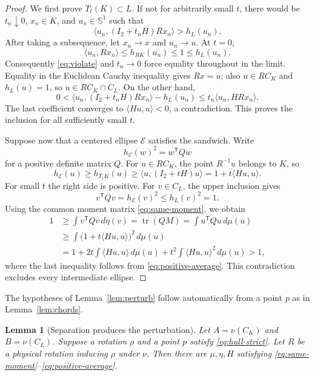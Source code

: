 \documentclass[11pt]{amsart}
\newtheorem{lemma}[theorem]{Lemma}
\theoremstyle{definition}
\theoremstyle{remark}
\newcommand{\Sph}{\mathbb S^1}
\newcommand{\tr}{\operatorname{tr}}
\newcommand{\ip}[2]{\langle #1,#2\rangle}
\begin{document}
\begin{proof}
We first prove $T_t(K)\subset L$.  If not for arbitrarily small $t$, there
would be $t_n\downarrow0$, $x_n\in K$, and $u_n\in\Sph$ such that
\begin{equation}\label{eq:violate}
 \ip{u_n}{(I_2+t_nH)R x_n}>h_L(u_n).
\end{equation}
After taking a subsequence, let $x_n\to x$ and $u_n\to u$.  At $t=0$,
\[
 \ip{u_n}{R x_n}\le h_{RK}(u_n)\le1\le h_L(u_n).
\]
Consequently \eqref{eq:violate} and $t_n\to0$ force equality throughout in
the limit.  Equality in the Euclidean Cauchy inequality gives $Rx=u$; also
$u\in R C_K$ and $h_L(u)=1$, so $u\in R C_K\cap C_L$.  On the other hand,
\[
 0<\ip{u_n}{(I_2+t_nH)R x_n}-h_L(u_n)
 \le t_n\ip{u_n}{H R x_n}.
\]
The last coefficient converges to $\ip{Hu}{u}<0$, a contradiction.  This
proves the inclusion for all sufficiently small $t$.

Suppose now that a centered ellipse $\mathcal E$ satisfies the sandwich.
Write
\[
 h_{\mathcal E}(w)^2=w^{\mathsf T}Qw
\]
for a positive definite matrix $Q$.  For $u\in R C_K$, the point
$R^{-1}u$ belongs to $K$, so
\begin{equation}\label{eq:lower-ellipse}
 h_{\mathcal E}(u)
 \ge h_{T_tK}(u)
 \ge \ip{u}{(I_2+tH)u}
 =1+t\ip{Hu}{u}.
\end{equation}
For small $t$ the right side is positive.  For $v\in C_L$, the upper
inclusion gives
\begin{equation}\label{eq:upper-ellipse}
 v^{\mathsf T}Qv=h_{\mathcal E}(v)^2\le h_L(v)^2=1.
\end{equation}
Using the common moment matrix \eqref{eq:same-moment}, we obtain
\begin{align*}
 1
 &\ge \int v^{\mathsf T}Qv\,d\eta(v)
   =\tr(QM)
   =\int u^{\mathsf T}Qu\,d\mu(u)\\
 &\ge \int\bigl(1+t\ip{Hu}{u}\bigr)^2\,d\mu(u)\\
 &=1+2t\int\ip{Hu}{u}\,d\mu(u)
   +t^2\int\ip{Hu}{u}^2\,d\mu(u)
 >1,
\end{align*}
where the last inequality follows from \eqref{eq:positive-average}.  This
contradiction excludes every intermediate ellipse.
\end{proof}

The hypotheses of Lemma~\ref{lem:perturb} follow automatically from a point
$p$ as in Lemma~\ref{lem:chords}.

\begin{lemma}[Separation produces the perturbation]\label{lem:separation}
Let $A=\nu(C_K)$ and $B=\nu(C_L)$.  Suppose a rotation $\rho$ and a point $p$
satisfy \eqref{eq:hull-strict}.  Let $R$ be a physical rotation inducing
$\rho$ under $\nu$.  Then there are $\mu,\eta,H$ satisfying
\eqref{eq:same-moment}--\eqref{eq:positive-average}.
\end{lemma}
\end{document}
